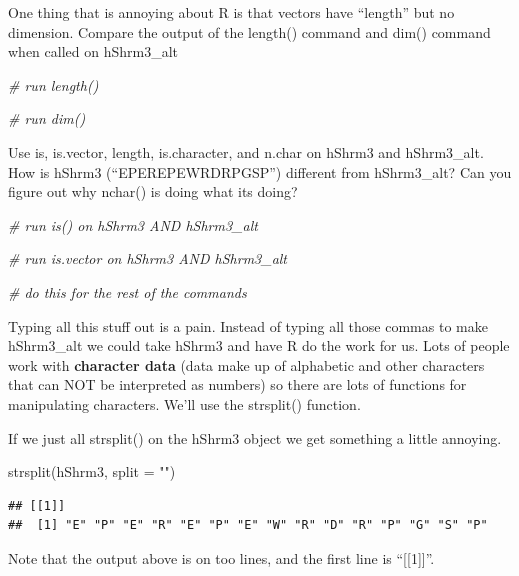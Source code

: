 \documentclass[
]{book}
\newenvironment{Shaded}{\begin{snugshade}}{\end{snugshade}}
\newcommand{\AttributeTok}[1]{\textcolor[rgb]{0.77,0.63,0.00}{#1}}
\newcommand{\CommentTok}[1]{\textcolor[rgb]{0.56,0.35,0.01}{\textit{#1}}}
\newcommand{\FunctionTok}[1]{\textcolor[rgb]{0.00,0.00,0.00}{#1}}
\newcommand{\NormalTok}[1]{#1}
\newcommand{\StringTok}[1]{\textcolor[rgb]{0.31,0.60,0.02}{#1}}
\begin{document}
One thing that is annoying about R is that vectors have ``length'' but no dimension. Compare the output of the length() command and dim() command when called on hShrm3\_alt

\begin{Shaded}
\begin{Highlighting}[]
\CommentTok{\# run length()}


\CommentTok{\# run dim()}
\end{Highlighting}
\end{Shaded}

Use is, is.vector, length, is.character, and n.char on hShrm3 and hShrm3\_alt. How is hShrm3 (``EPEREPEWRDRPGSP'') different from hShrm3\_alt? Can you figure out why nchar() is doing what its doing?

\begin{Shaded}
\begin{Highlighting}[]
\CommentTok{\# run is() on hShrm3 AND hShrm3\_alt}


\CommentTok{\# run is.vector on hShrm3 AND hShrm3\_alt}


\CommentTok{\# do this for the rest of the commands}
\end{Highlighting}
\end{Shaded}

Typing all this stuff out is a pain. Instead of typing all those commas to make hShrm3\_alt we could take hShrm3 and have R do the work for us. Lots of people work with \textbf{character data} (data make up of alphabetic and other characters that can NOT be interpreted as numbers) so there are lots of functions for manipulating characters. We'll use the strsplit() function.

If we just all strsplit() on the hShrm3 object we get something a little annoying.

\begin{Shaded}
\begin{Highlighting}[]
\FunctionTok{strsplit}\NormalTok{(hShrm3, }\AttributeTok{split =} \StringTok{""}\NormalTok{)}
\end{Highlighting}
\end{Shaded}

\begin{verbatim}
## [[1]]
##  [1] "E" "P" "E" "R" "E" "P" "E" "W" "R" "D" "R" "P" "G" "S" "P"
\end{verbatim}

Note that the output above is on too lines, and the first line is ``{[}{[}1{]}{]}''.
\end{document}
